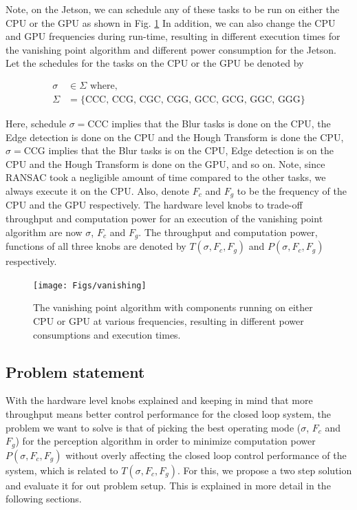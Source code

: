 Note, on the Jetson, we can schedule any of these tasks to be run on either the CPU or the GPU as shown in Fig. \ref{fig:vanishing} In addition, we can also change the CPU and GPU frequencies during run-time, resulting in different execution times for the vanishing point algorithm and different power consumption for the Jetson. Let the schedules for the tasks on the CPU or the GPU be denoted by 

\begin{subequations}
\begin{align}
\sigma&\in\Sigma\text{ where,} \nonumber \\
\Sigma&=\{\text{CCC, CCG, CGC, CGG, GCC, GCG, GGC, GGG}\} \nonumber
\end{align}
\end{subequations}

Here, schedule $\sigma=\text{CCC}$ implies that the Blur tasks is done on the CPU, the Edge detection is done on the CPU and the Hough Transform is done the CPU, $\sigma=\text{CCG}$ implies that the Blur tasks is on the CPU, Edge detection is on the CPU and the Hough Transform is done on the GPU, and so on. Note, since RANSAC took a negligible amount of time compared to the other tasks, we always execute it on the CPU.
Also, denote $F_c$ and $F_g$ to be the frequency of the CPU and the GPU respectively. The hardware level knobs to trade-off throughput and computation power for an execution of the vanishing point algorithm are now $\sigma$, $F_c$ and $F_g$. The throughput and computation power, functions  of all three knobs are denoted by $T(\sigma,F_c,F_g)$ and $P(\sigma,F_c,F_g)$ respectively.

\begin{figure}
	\centering
	\texttt{[image: Figs/vanishing]}
	\caption{The vanishing point algorithm with components running on either CPU or GPU at various frequencies, resulting in different power consumptions and execution times.}
	\label{fig:vanishing}		
\end{figure}

\subsection{Problem statement}
With the hardware level knobs explained and keeping in mind that more throughput means better control performance for the closed loop system, the problem we want to solve is that of picking the best operating mode ($\sigma$, $F_c$ and $F_g$) for the perception algorithm in order to minimize computation power $P(\sigma,F_c,F_g)$ without overly affecting the closed loop control performance of the system, which is related to $T(\sigma,F_c,F_g)$. For this, we propose a two step solution and evaluate it for out problem setup. This is explained in more detail in the following sections.


